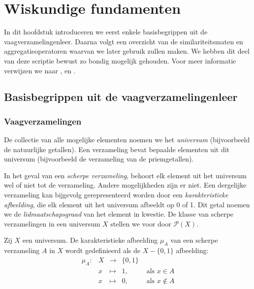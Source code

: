 \chapter{Wiskundige fundamenten}

In dit hoofdstuk introduceren we eerst enkele basisbegrippen uit de vaagverzamelingenleer. 
Daarna volgt een overzicht van de similariteitsmaten en aggregatieoperatoren waarvan
we later gebruik zullen maken. We hebben dit deel van deze scriptie bewust zo 
bondig mogelijk gehouden. Voor meer informatie verwijzen
we naar \cite{kerre:vaagmodellen}, \cite{vanderweken:similariteitsmaten} en 
\cite{victor:aggregatieoperatoren}.


\section{Basisbegrippen uit de vaagverzamelingenleer}

\subsection{Vaagverzamelingen}

De collectie van alle mogelijke elementen noemen we het \emph{universum} (bijvoorbeeld de
natuurlijke getallen). Een verzameling bevat bepaalde elementen uit dit universum (bijvoorbeeld de 
verzameling van de priemgetallen). 

In het geval van een \emph{scherpe verzameling}, behoort elk 
element uit het universum wel of niet tot de verzameling. Andere mogelijkheden zijn er
niet. Een dergelijke verzameling kan bijgevolg 
gerepresenteerd worden door een \emph{karakteristieke afbeelding}, die elk element uit het 
universum afbeeldt op 0 of 1. Dit getal noemen we de \emph{lidmaatschapsgraad} van het element 
in kwestie. De klasse van scherpe verzamelingen in een universum $X$ stellen we voor door 
$\mathcal{P}(X)$.
\begin{definitie}
Zij $X$ een universum. De karakteristieke afbeelding $\mu_A$ van een scherpe verzameling $A$ in $X$
wordt gedefinieerd als de $X - \{0,1\}$ afbeelding:
$$
\begin{array}{lllll}
\mu_A: 	& X & \to 		& \{0,1\}	& \\
		& x & \mapsto 	& 1,		& \textrm{ als } x \in A \\
		& x & \mapsto 	& 0,		& \textrm{ als } x \notin A
\end{array}
$$
\end{definitie}

